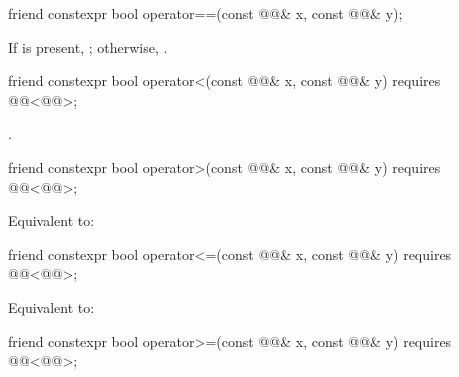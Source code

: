 %
\begin{itemdecl}
friend constexpr bool operator==(const @@& x, const @@& y);
\end{itemdecl}

\begin{itemdescr}
\pnum
\returns
If  is present,
;
otherwise, .
\end{itemdescr}

%
\begin{itemdecl}
friend constexpr bool operator<(const @@& x, const @@& y)
  requires @@<@@>;
\end{itemdecl}

\begin{itemdescr}
\pnum
\returns
{}.
\end{itemdescr}

%
\begin{itemdecl}
friend constexpr bool operator>(const @@& x, const @@& y)
  requires @@<@@>;
\end{itemdecl}

\begin{itemdescr}
\pnum
\effects
Equivalent to: 
\end{itemdescr}

%
\begin{itemdecl}
friend constexpr bool operator<=(const @@& x, const @@& y)
  requires @@<@@>;
\end{itemdecl}

\begin{itemdescr}
\pnum
\effects
Equivalent to: 
\end{itemdescr}

%
\begin{itemdecl}
friend constexpr bool operator>=(const @@& x, const @@& y)
  requires @@<@@>;
\end{itemdecl}

